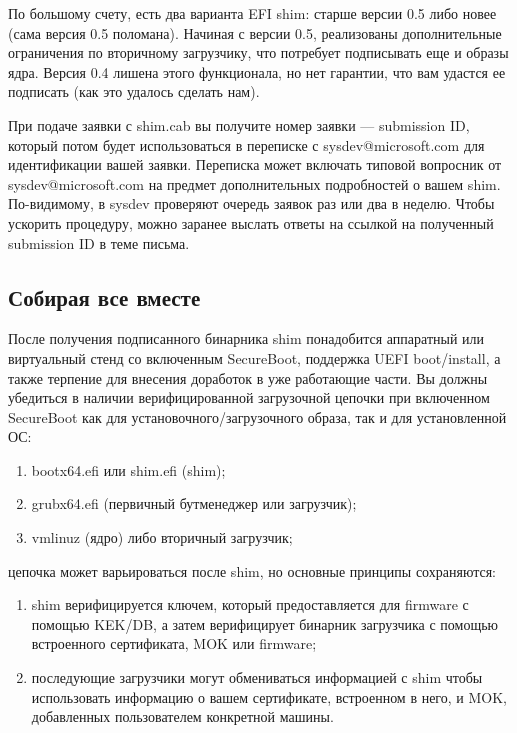 \documentclass[10pt, a5paper]{article}
\begin{document}
По большому счету, есть два варианта EFI shim: старше версии 0.5 либо новее (сама версия 0.5 поломана). Начиная с версии 0.5, реализованы дополнительные ограничения по вторичному загрузчику, что потребует подписывать еще и образы ядра. Версия 0.4 лишена этого функционала, но нет гарантии, что вам удастся ее подписать (как это удалось сделать нам).

При подаче заявки с shim.cab вы получите номер заявки --- submission ID, который потом будет использоваться в переписке с sysdev@microsoft.com для идентификации вашей заявки. Переписка может включать типовой вопросник от sysdev@microsoft.com на предмет дополнительных подробностей о вашем shim. По-видимому, в sysdev проверяют очередь заявок раз или два в неделю. Чтобы ускорить процедуру, можно заранее выслать ответы на ссылкой на полученный submission ID в теме письма.

\subsection*{Собирая все вместе}

После получения подписанного бинарника shim понадобится аппаратный или виртуальный стенд со включенным SecureBoot, поддержка UEFI boot/install, а также терпение для внесения доработок в уже работающие части.
Вы должны убедиться в наличии верифицированной загрузочной цепочки при включенном SecureBoot как для установочного/загрузочного образа, так и для установленной ОС:

\begin{enumerate}
  \item bootx64.efi или shim.efi (shim);
  \item grubx64.efi (первичный бутменеджер или загрузчик);
  \item vmlinuz (ядро) либо вторичный загрузчик;
\end{enumerate}

цепочка может варьироваться после shim, но основные принципы сохраняются:

\begin{enumerate}
  \item shim верифицируется ключем, который предоставляется для firmware с помощью KEK/DB, а затем верифицирует бинарник загрузчика с помощью встроенного сертификата, MOK или firmware;
  \item последующие загрузчики могут обмениваться информацией с shim чтобы использовать информацию о вашем сертификате, встроенном в него, и MOK, добавленных пользователем конкретной машины.
\end{enumerate}
\end{document}
